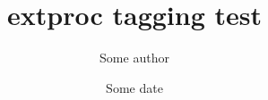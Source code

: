 \documentclass{extproc}
\title{extproc tagging test}
\author{Some author}
\date{Some date}
\begin{document}
\maketitle
\tableofcontents
\blinddocument
\end{document}
